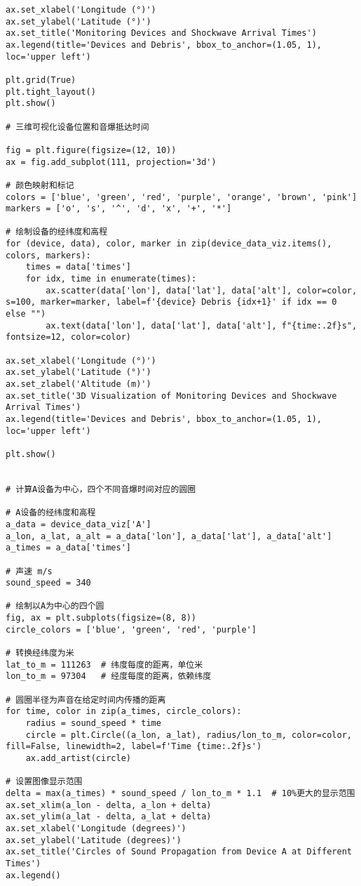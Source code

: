 \documentclass[withoutpreface,bwprint,12pt,a4paper]{cumcmthesis}
\begin{document}
\begin{appendices}
\begin{lstlisting}
ax.set_xlabel('Longitude (°)')
ax.set_ylabel('Latitude (°)')
ax.set_title('Monitoring Devices and Shockwave Arrival Times')
ax.legend(title='Devices and Debris', bbox_to_anchor=(1.05, 1), loc='upper left')

plt.grid(True)
plt.tight_layout()
plt.show()

# 三维可视化设备位置和音爆抵达时间

fig = plt.figure(figsize=(12, 10))
ax = fig.add_subplot(111, projection='3d')

# 颜色映射和标记
colors = ['blue', 'green', 'red', 'purple', 'orange', 'brown', 'pink']
markers = ['o', 's', '^', 'd', 'x', '+', '*']

# 绘制设备的经纬度和高程
for (device, data), color, marker in zip(device_data_viz.items(), colors, markers):
    times = data['times']
    for idx, time in enumerate(times):
        ax.scatter(data['lon'], data['lat'], data['alt'], color=color, s=100, marker=marker, label=f'{device} Debris {idx+1}' if idx == 0 else "")
        ax.text(data['lon'], data['lat'], data['alt'], f"{time:.2f}s", fontsize=12, color=color)

ax.set_xlabel('Longitude (°)')
ax.set_ylabel('Latitude (°)')
ax.set_zlabel('Altitude (m)')
ax.set_title('3D Visualization of Monitoring Devices and Shockwave Arrival Times')
ax.legend(title='Devices and Debris', bbox_to_anchor=(1.05, 1), loc='upper left')

plt.show()


# 计算A设备为中心，四个不同音爆时间对应的圆圈

# A设备的经纬度和高程
a_data = device_data_viz['A']
a_lon, a_lat, a_alt = a_data['lon'], a_data['lat'], a_data['alt']
a_times = a_data['times']

# 声速 m/s
sound_speed = 340

# 绘制以A为中心的四个圆
fig, ax = plt.subplots(figsize=(8, 8))
circle_colors = ['blue', 'green', 'red', 'purple']

# 转换经纬度为米
lat_to_m = 111263  # 纬度每度的距离，单位米
lon_to_m = 97304   # 经度每度的距离，依赖纬度

# 圆圈半径为声音在给定时间内传播的距离
for time, color in zip(a_times, circle_colors):
    radius = sound_speed * time
    circle = plt.Circle((a_lon, a_lat), radius/lon_to_m, color=color, fill=False, linewidth=2, label=f'Time {time:.2f}s')
    ax.add_artist(circle)

# 设置图像显示范围
delta = max(a_times) * sound_speed / lon_to_m * 1.1  # 10%更大的显示范围
ax.set_xlim(a_lon - delta, a_lon + delta)
ax.set_ylim(a_lat - delta, a_lat + delta)
ax.set_xlabel('Longitude (degrees)')
ax.set_ylabel('Latitude (degrees)')
ax.set_title('Circles of Sound Propagation from Device A at Different Times')
ax.legend()


\end{lstlisting}
\end{appendices}
\end{document}
